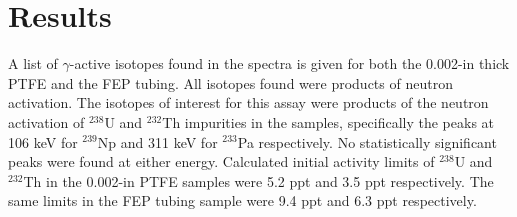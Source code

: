 







\section{Results}

A list of $\gamma$-active isotopes found in the spectra is given for both the 0.002-in thick PTFE and the FEP tubing.  All isotopes found were products of neutron activation.  The isotopes of interest for this assay were products of the neutron activation of $^{238}$U and $^{232}$Th impurities in the samples, specifically the peaks at 106 keV for $^{239}$Np and 311 keV
for $^{233}$Pa respectively.  No statistically significant peaks were found at either energy.  Calculated initial activity limits of $^{238}$U and $^{232}$Th in the 0.002-in PTFE samples were 5.2 ppt and 3.5 ppt respectively.  The same limits in the FEP tubing sample were 9.4 ppt and 6.3 ppt respectively.


